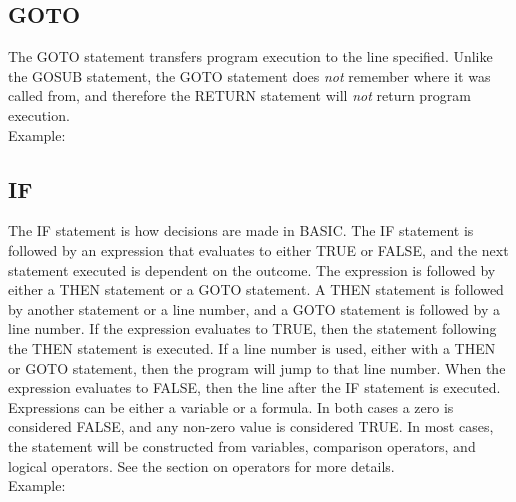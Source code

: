 \subsection{GOTO}

The {\ttfamily GOTO} statement transfers program execution to the line
specified.  Unlike the {\ttfamily GOSUB} statement, the {\ttfamily GOTO}
statement does {\em not} remember where it was called from, and therefore the
{\ttfamily RETURN} statement will {\em not} return program execution.\\

Example:\\


\subsection{IF}

The {\ttfamily IF} statement is how decisions are made in BASIC.  The
{\ttfamily IF} statement is followed by an expression that evaluates to either
{\ttfamily TRUE} or {\ttfamily FALSE}, and the next statement executed is
dependent on the outcome.  The expression is followed by either a {\ttfamily
THEN} statement or a {\ttfamily GOTO} statement.  A {\ttfamily THEN} statement
is followed by another statement or a line number, and a {\ttfamily GOTO
statement} is followed by a line number.  If the expression evaluates to
{\ttfamily TRUE}, then the statement following the {\ttfamily THEN} statement
is executed.  If a line number is used, either with a {\ttfamily THEN} or
{\ttfamily GOTO} statement, then the program will jump to that line number.
When the expression evaluates to {\ttfamily FALSE}, then the line after the
{\ttfamily IF} statement is executed.\\

Expressions can be either a variable or a formula.  In both cases a zero is
considered {\ttfamily FALSE}, and any non-zero value is considered {\ttfamily
TRUE}.  In most cases, the statement will be constructed from variables,
comparison operators, and logical operators.  See the section on operators for
more details.\\

Example:\\

